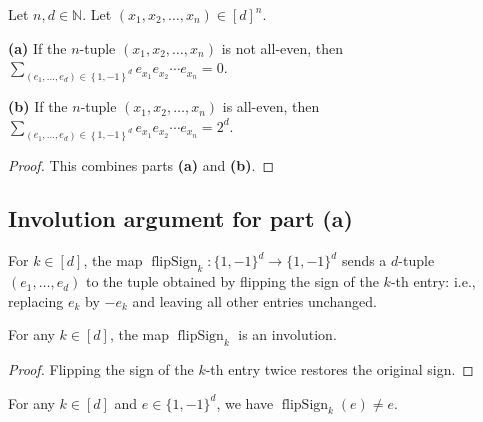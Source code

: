 \begin{lemma}
\label{lem.cancel.all-even.l2}
\leantarget
\leanok
Let $n,d\in\mathbb{N}$. Let $\left(  x_{1},x_{2},\ldots,x_{n}\right)
\in\left[  d\right]  ^{n}$.

\textbf{(a)} If the $n$-tuple $\left(  x_{1},x_{2},\ldots,x_{n}\right)$ is
not all-even, then
$\sum_{\left(  e_{1},\ldots,e_{d}\right)  \in\left\{  1,-1\right\}  ^{d}}
e_{x_{1}}e_{x_{2}}\cdots e_{x_{n}}=0$.

\textbf{(b)} If the $n$-tuple $\left(  x_{1},x_{2},\ldots,x_{n}\right)$ is
all-even, then
$\sum_{\left(  e_{1},\ldots,e_{d}\right)  \in\left\{  1,-1\right\}  ^{d}}
e_{x_{1}}e_{x_{2}}\cdots e_{x_{n}}=2^{d}$.
\end{lemma}

\begin{proof}
\leanok
This combines parts \textbf{(a)} and \textbf{(b)}.
\end{proof}

\subsection{Involution argument for part (a)}

\begin{definition}
\label{def.cancel.flipSign}
\leanhelper
\leanok
For $k \in [d]$, the map $\operatorname{flipSign}_k : \{1,-1\}^d \to \{1,-1\}^d$
sends a $d$-tuple $(e_1, \ldots, e_d)$ to the tuple obtained by flipping
the sign of the $k$-th entry: i.e., replacing $e_k$ by $-e_k$ and
leaving all other entries unchanged.
\end{definition}

\begin{lemma}
\label{lem.cancel.flipSign-involutive}
\leanhelper
\leanok
For any $k \in [d]$, the map $\operatorname{flipSign}_k$ is an involution.
\end{lemma}

\begin{proof}
\leanok
Flipping the sign of the $k$-th entry twice restores the original sign.
\end{proof}

\begin{lemma}
\label{lem.cancel.flipSign-ne}
\leanhelper
\leanok
For any $k \in [d]$ and $e \in \{1,-1\}^d$, we have
$\operatorname{flipSign}_k(e) \neq e$.
\end{lemma}

